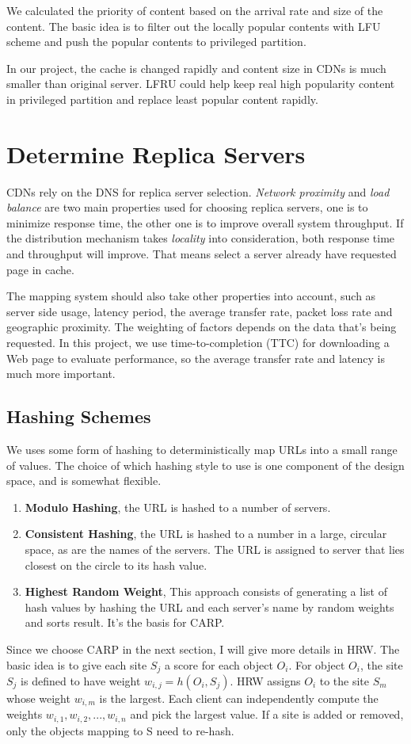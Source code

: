 \documentclass{elegantpaper}
\begin{document}
We calculated the priority of content based on the arrival rate and size of the content\cite{7857720}. The basic idea is to filter out the locally popular contents with LFU scheme and push the popular contents to privileged partition.

In our project, the cache is changed rapidly and content size in CDNs is much smaller than original server. LFRU could help keep real high popularity content in privileged partition and replace least popular content rapidly.

\section{Determine Replica Servers}
CDNs rely on the DNS for replica server selection\cite{CDN1}. \textit{Network proximity} and \textit{load balance} are two main properties used for choosing replica servers, one is to minimize response time, the other one is to improve overall system throughput. If the distribution mechanism takes \textit{locality} into consideration, both response time and throughput will improve. That means select a server already have requested page in cache.

The mapping system should also take other properties into account, such as server side usage, latency period, the average transfer rate, packet loss rate and geographic proximity\cite{CDN2}. The weighting of factors depends on the data that's being requested. In this project, we use time-to-completion (TTC) for downloading a Web page to evaluate performance, so the average transfer rate and latency is much more important.

\subsection{Hashing Schemes}
We uses some form of hashing to deterministically map URLs into a small range of values\cite{Wang:2002:ERR:844128.844160}. The choice of which hashing style to use is one component of the design space, and is somewhat flexible.
\begin{enumerate}
	\item \textbf{Modulo Hashing}, the URL is hashed to a number of servers.
	\item \textbf{Consistent Hashing}, the URL is hashed to a number in a large, circular space, as are the names of the servers. The URL is assigned to server that lies closest on the circle to its hash value.
	\item \textbf{Highest Random Weight}, This approach consists of generating a list of hash values by hashing the URL and each server's name by random weights and sorts result. It's the basis for CARP.
\end{enumerate}
Since we choose CARP in the next section, I will give more details in HRW. The basic idea is to give each site $S_j$ a score for each object $O_i$. For object $O_i$, the site $S_j$ is defined to have weight $w_{i,j}=h(O_i,S_j)$. HRW assigns $O_i$ to the site $S_m$ whose weight $w_{i,m}$ is the largest. Each client can independently compute the weights $w_{i,1}, w_{i,2},...,w_{i,n}$ and pick the largest value. If a site is added or removed, only the objects mapping to S need to re-hash\cite{HRW}.
\end{document}
